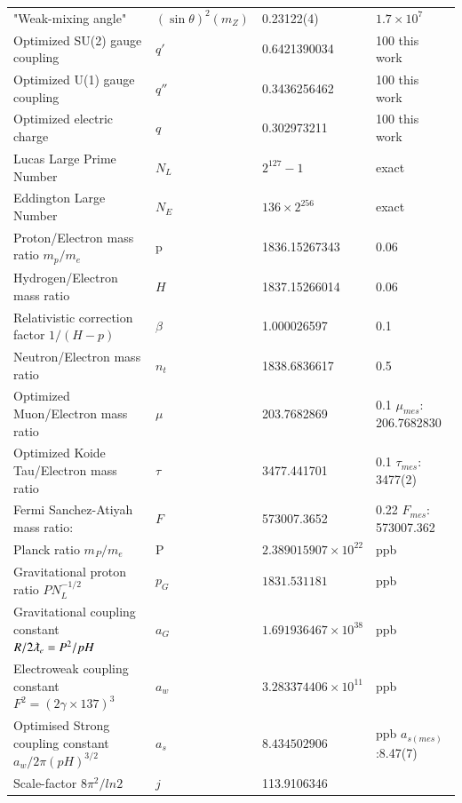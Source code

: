 \documentclass[a4paper,9pt]{article}
\newcounter{row}
\begin{document}
\begin{table}
\begin{tabular}{llll}
  
  "Weak-mixing angle"  & $(\sin \theta)^2(m_Z)$    & 0.23122(4) & $1.7 \times 10^7$ \\
  
   Optimized SU(2) gauge coupling &{$q'$}     & 0.6421390034 & 100 this work \\
   Optimized U(1) gauge coupling & {$q''$}    & 0.3436256462 & 100 this work \\
   Optimized electric charge & $ q $    & 0.302973211 & 100 this work\\
        
                     
    Lucas Large Prime Number & $N_L$    & $2^{127}-1$  & exact \\
    Eddington Large Number & $N_{E}$    & $136\times 2^{256}$  & exact \\
          
    Proton/Electron mass ratio $m_p/m_e$ & p   & 1836.15267343  & 0.06 \\  
    Hydrogen/Electron mass ratio  & $H$  & 1837.15266014  & 0.06 \\
    Relativistic correction factor $1/(H-p)$ & $\beta$  & 1.000026597  & 0.1 \\
    Neutron/Electron mass ratio  & $n_t$ & 1838.6836617  & 0.5 \\     
    Optimized Muon/Electron mass ratio  & $\mu$ & 203.7682869  & 0.1 $\mu_{mes}$: 206.7682830 \\     
    Optimized Koide Tau/Electron mass ratio  & $\tau$ & 3477.441701  & 0.1 $\tau_{mes}$: 3477(2) \\  
 Fermi Sanchez-Atiyah mass ratio: & $F$   & 573007.3652  & 0.22 $F_{mes}$: 573007.362 \\
 Planck ratio $m_P/m_e$ & P   & $2.389015907 \times 10^{22}$ &ppb  \cite{Sanchez2}  \\
 Gravitational proton ratio $P N_L^{-1/2}$ & $p_G$    & $ 1831.531181 $ &ppb  \cite{Sanchez2}  \\
 Gravitational coupling constant $R/2\lambdabar_e = P^2/pH$ & $a_G$   & $1.691936467 \times 10^{38}$ &ppb  \cite{Sanchez2}  \\
 Electroweak coupling constant $F^2 = (2\gamma\times 137)^3$ & $a_w$     & $3.283374406 \times 10^{11}$ & ppb \cite{Sanchez2}  \\
Optimised Strong coupling constant $a_w/2\pi(pH)^{3/2}$ & $a_s$   & $8.434502906$ & ppb \cite{Sanchez2} $a_{s(mes)}$:8.47(7) \\
 Scale-factor $8\pi^2/ln2$  & $j$ & 113.9106346  & \cite{Sternheimer} \\  
   

\end{tabular}
\end{table}
\end{document}
